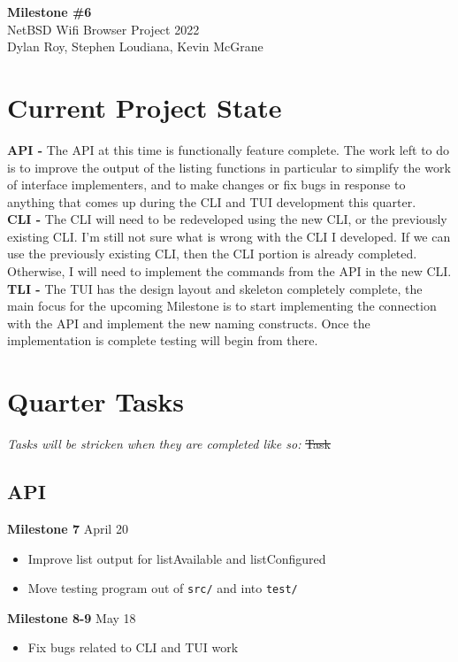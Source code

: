 \documentclass[11pt]{article}
\begin{document}
\begin{center}
  \textbf{\Large Milestone \#6}\\\large NetBSD Wifi Browser Project 2022\\
  Dylan Roy, Stephen Loudiana, Kevin McGrane
\end{center}


\section*{Current Project State}
\textbf{API -} The API at this time is functionally feature complete.
The work left to do is to improve the output of the listing functions in
particular to simplify the work of interface implementers, and to make
changes or fix bugs in response to anything that comes up during the CLI
and TUI development this quarter.\\

\textbf{CLI -} The CLI will need to be redeveloped using the new CLI, or the 
previously existing CLI. I'm still not sure what is wrong with the CLI I developed.
If we can use the previously existing CLI, then the CLI portion is already completed. 
Otherwise, I will need to implement the commands from the API in the new CLI. \\

\textbf{TLI -} The TUI has the design layout and skeleton completely complete, 
the main focus for the upcoming Milestone is to start implementing the connection 
with the API and implement the new naming constructs. Once the implementation 
is complete testing will begin from there. \\

\section*{Quarter Tasks}

\textit{Tasks will be stricken when they are completed like so:} \sout{Task}

\subsection*{API}
\textbf{Milestone 7} April 20
\begin{itemize}
  \item Improve list output for listAvailable and listConfigured
  \item Move testing program out of \texttt{src/} and into \texttt{test/}
\end{itemize}
\textbf{Milestone 8-9} May 18
\begin{itemize}
  \item Fix bugs related to CLI and TUI work
\end{itemize}
\end{document}
